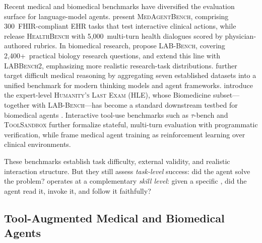 Recent medical and biomedical benchmarks have diversified the evaluation surface for language-model agents.
\citet{medagentbench2025} present \textsc{MedAgentBench}, comprising 300~FHIR-compliant EHR tasks that test interactive clinical actions, while \citet{healthbench2025} release \textsc{HealthBench} with 5,000~multi-turn health dialogues scored by physician-authored rubrics.
In biomedical research, \citet{labbench2024} propose \textsc{LAB-Bench}, covering 2,400+~practical biology research questions, and \citet{labbench22026} extend this line with \textsc{LABBench2}, emphasizing more realistic research-task distributions.
\citet{medagentsbench2025} further target difficult medical reasoning by aggregating seven established datasets into a unified benchmark for modern thinking models and agent frameworks.
\citet{hle2025} introduce the expert-level \textsc{Humanity's Last Exam} (HLE), whose Biomedicine subset---together with \textsc{LAB-Bench}---has become a standard downstream testbed for biomedical agents \citep{stella2025,biomni2025}.
Interactive tool-use benchmarks such as $\tau$-bench \citep{taubench2024} and \textsc{ToolSandbox} \citep{toolsandbox2024} further formalize stateful, multi-turn evaluation with programmatic verification, while \citet{medagentgym2025} frame medical agent training as reinforcement learning over clinical environments.

These benchmarks establish task difficulty, external validity, and realistic interaction structure.
But they still assess \emph{task-level} success: did the agent solve the problem?
\medskillbench operates at a complementary \emph{skill level}: given a specific \skillmd, did the agent read it, invoke it, and follow it faithfully?

\subsection{Tool-Augmented Medical and Biomedical Agents}
\label{sec:rw_medical_agents}

